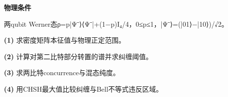 \textbf{物理条件}\par 两qubit Werner态ρ=p|Ψ⁻⟩⟨Ψ⁻|+(1−p)I₄/4，0≤p≤1，|Ψ⁻⟩=(|01⟩−|10⟩)/√2。
\par\noindent\textbf{(1)} 求密度矩阵本征值与物理正定范围。
\par\noindent\textbf{(2)} 计算对第二比特部分转置的谱并求纠缠阈值。
\par\noindent\textbf{(3)} 求两比特concurrence与混态纯度。
\par\noindent\textbf{(4)} 用CHSH最大值比较纠缠与Bell不等式违反区域。
